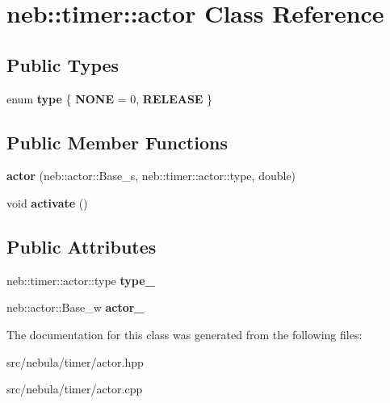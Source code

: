 \hypertarget{classneb_1_1timer_1_1actor}{
\section{neb::timer::actor Class Reference}
\label{classneb_1_1timer_1_1actor}
}
\subsection*{Public Types}
\begin{DoxyCompactItemize}
\item 
enum {\bfseries type} \{ {\bfseries NONE} =  0, 
{\bfseries RELEASE}
 \}
\end{DoxyCompactItemize}
\subsection*{Public Member Functions}
\begin{DoxyCompactItemize}
\item 
\hypertarget{classneb_1_1timer_1_1actor_a984227ae1202c6186a64c7e380075c02}{
{\bfseries actor} (neb::actor::Base\_\-s, neb::timer::actor::type, double)}
\label{classneb_1_1timer_1_1actor_a984227ae1202c6186a64c7e380075c02}

\item 
\hypertarget{classneb_1_1timer_1_1actor_add40087ffdbe024cf088df0a7bb1f3e5}{
void {\bfseries activate} ()}
\label{classneb_1_1timer_1_1actor_add40087ffdbe024cf088df0a7bb1f3e5}

\end{DoxyCompactItemize}
\subsection*{Public Attributes}
\begin{DoxyCompactItemize}
\item 
\hypertarget{classneb_1_1timer_1_1actor_a60bf1a63a5c299ddebae5037c830cae0}{
neb::timer::actor::type {\bfseries type\_\-}}
\label{classneb_1_1timer_1_1actor_a60bf1a63a5c299ddebae5037c830cae0}

\item 
\hypertarget{classneb_1_1timer_1_1actor_a2eba8ad0b8642bed9d08c846b1a193a0}{
neb::actor::Base\_\-w {\bfseries actor\_\-}}
\label{classneb_1_1timer_1_1actor_a2eba8ad0b8642bed9d08c846b1a193a0}

\end{DoxyCompactItemize}


The documentation for this class was generated from the following files:\begin{DoxyCompactItemize}
\item 
src/nebula/timer/actor.hpp\item 
src/nebula/timer/actor.cpp\end{DoxyCompactItemize}
